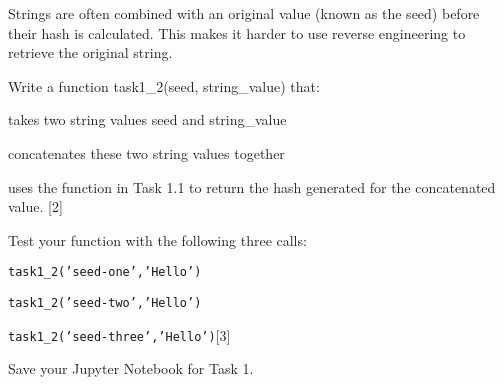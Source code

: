 \begin{onehalfspace}
\noindent Strings are often combined with an original value (known
as the seed) before their hash is calculated. This makes it harder
to use reverse engineering to retrieve the original string.

\noindent Write a function task1\_2(seed, string\_value) that:
\end{onehalfspace}
\begin{itemize}
\begin{onehalfspace}
\item takes two string values seed and string\_value
\item concatenates these two string values together
\item uses the function in Task 1.1 to return the hash generated for the
concatenated value. \hfill{}{[}2{]}
\end{onehalfspace}
\end{itemize}
\begin{onehalfspace}
\noindent Test your function with the following three calls:
\end{onehalfspace}
\begin{itemize}
\begin{onehalfspace}
\item \texttt{task1\_2('seed-one','Hello')}
\item \texttt{task1\_2('seed-two','Hello')}
\item \texttt{task1\_2('seed-three','Hello')}\hfill{}{[}3{]}
\end{onehalfspace}
\end{itemize}
\begin{onehalfspace}
\noindent Save your Jupyter Notebook for Task 1. 
\end{onehalfspace}